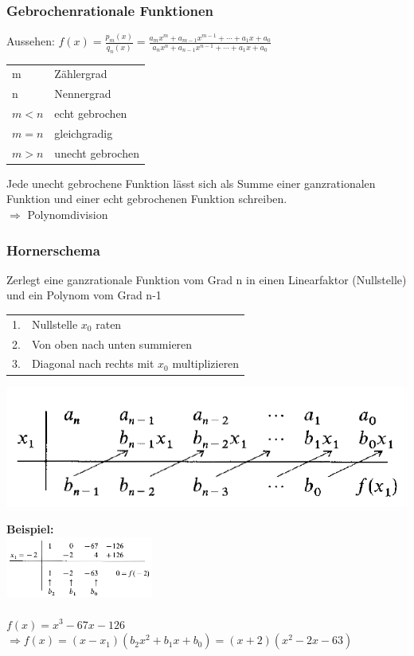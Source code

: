 		\subsubsection{Gebrochenrationale Funktionen}
			Aussehen: $f(x)=\frac{p_m(x)}{q_n(x)}=\frac{a_mx^{m}+a_{m-1}x^{m-1}+\cdots+a_1x+a_0}{a_nx^{n}+a_{n-1}x^{n-1}+\cdots+a_1x+a_0}$ \\
			
			\begin{tabular}{ll} 
				m & Zählergrad \\
				n & Nennergrad \\
				$m < n$ & echt gebrochen \\
				$m = n$ & gleichgradig \\
				$m > n$ & unecht gebrochen \\ 
			\end{tabular}	
		
			Jede unecht gebrochene Funktion lässt sich als Summe einer ganzrationalen Funktion und einer echt gebrochenen Funktion schreiben. \\
			$\Rightarrow$ Polynomdivision \\

		\subsubsection{Hornerschema}
			Zerlegt eine ganzrationale Funktion vom Grad n in einen Linearfaktor (Nullstelle) und ein Polynom vom Grad n-1 \\
			
			\begin{tabular}{ll}
				1. & Nullstelle $x_0$ raten \\
				2. & Von oben nach unten summieren \\
				3. & Diagonal nach rechts mit $x_0$ multiplizieren \\
			\end{tabular}	
			
			\includegraphics[width=0.7\linewidth]{Bilder/hornerschema_allg}
					
			\textbf{Beispiel:}\\
				\includegraphics[height=2cm]{Bilder/hornerschema_bsp} \\
				\\
				$f(x) = x^3-67x-126$\\
				$\Rightarrow f(x) = (x-x_1)(b_2x^2 + b_1x + b_0) = (x+2)(x^2-2x-63)$ 
			
